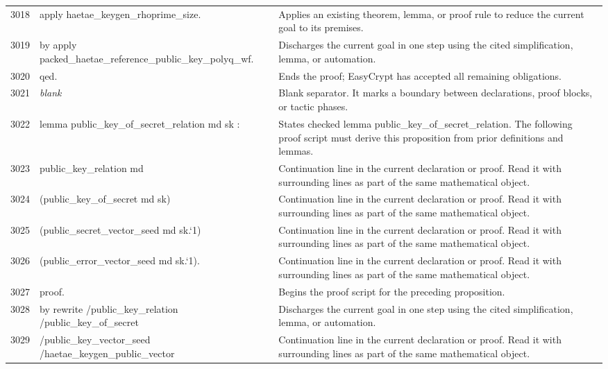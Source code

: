 \documentclass[10pt]{article}
\begin{document}
\begin{longtable}{r L{0.53\textwidth} L{0.37\textwidth}}
3018 & {\ttfamily\scriptsize       apply haetae\_keygen\_rhoprime\_size.} & Applies an existing theorem, lemma, or proof rule to reduce the current goal to its premises. \\
3019 & {\ttfamily\scriptsize by apply packed\_haetae\_reference\_public\_key\_polyq\_wf.} & Discharges the current goal in one step using the cited simplification, lemma, or automation. \\
3020 & {\ttfamily\scriptsize qed.} & Ends the proof; EasyCrypt has accepted all remaining obligations. \\
3021 & {\ttfamily\scriptsize \emph{blank}} & Blank separator.  It marks a boundary between declarations, proof blocks, or tactic phases. \\
3022 & {\ttfamily\scriptsize lemma public\_key\_of\_secret\_relation md sk :} & States checked lemma public\_key\_of\_secret\_relation.  The following proof script must derive this proposition from prior definitions and lemmas. \\
3023 & {\ttfamily\scriptsize   public\_key\_relation md} & Continuation line in the current declaration or proof.  Read it with surrounding lines as part of the same mathematical object. \\
3024 & {\ttfamily\scriptsize     (public\_key\_of\_secret md sk)} & Continuation line in the current declaration or proof.  Read it with surrounding lines as part of the same mathematical object. \\
3025 & {\ttfamily\scriptsize     (public\_secret\_vector\_seed md sk.`1)} & Continuation line in the current declaration or proof.  Read it with surrounding lines as part of the same mathematical object. \\
3026 & {\ttfamily\scriptsize     (public\_error\_vector\_seed md sk.`1).} & Continuation line in the current declaration or proof.  Read it with surrounding lines as part of the same mathematical object. \\
3027 & {\ttfamily\scriptsize proof.} & Begins the proof script for the preceding proposition. \\
3028 & {\ttfamily\scriptsize by rewrite /public\_key\_relation /public\_key\_of\_secret} & Discharges the current goal in one step using the cited simplification, lemma, or automation. \\
3029 & {\ttfamily\scriptsize            /public\_key\_vector\_seed /haetae\_keygen\_public\_vector} & Continuation line in the current declaration or proof.  Read it with surrounding lines as part of the same mathematical object. \\

\end{longtable}
\end{document}
